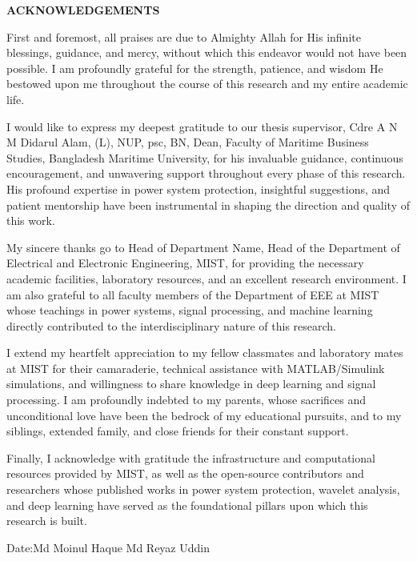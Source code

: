 \documentclass[12pt,a4paper,oneside]{report}
\newcommand{\frontchap}[1]{%
  \clearpage\thispagestyle{fancy}%
  \begin{center}\Large\bfseries #1\end{center}\vspace{6pt}%
  \addcontentsline{toc}{chapter}{#1}}
\begin{document}
\frontchap{ACKNOWLEDGEMENTS}
First and foremost, all praises are due to Almighty Allah for His infinite blessings, guidance, and mercy, without which this endeavor would not have been possible. I am profoundly grateful for the strength, patience, and wisdom He bestowed upon me throughout the course of this research and my entire academic life.

I would like to express my deepest gratitude to our thesis supervisor, Cdre A N M Didarul Alam, (L), NUP, psc, BN, Dean, Faculty of Maritime Business Studies, Bangladesh Maritime University, for his invaluable guidance, continuous encouragement, and unwavering support throughout every phase of this research. His profound expertise in power system protection, insightful suggestions, and patient mentorship have been instrumental in shaping the direction and quality of this work.

My sincere thanks go to Head of Department Name, Head of the Department of Electrical and Electronic Engineering, MIST, for providing the necessary academic facilities, laboratory resources, and an excellent research environment. I am also grateful to all faculty members of the Department of EEE at MIST whose teachings in power systems, signal processing, and machine learning directly contributed to the interdisciplinary nature of this research.

I extend my heartfelt appreciation to my fellow classmates and laboratory mates at MIST for their camaraderie, technical assistance with MATLAB/Simulink simulations, and willingness to share knowledge in deep learning and signal processing. I am profoundly indebted to my parents, whose sacrifices and unconditional love have been the bedrock of my educational pursuits, and to my siblings, extended family, and close friends for their constant support.

Finally, I acknowledge with gratitude the infrastructure and computational resources provided by MIST, as well as the open-source contributors and researchers whose published works in power system protection, wavelet analysis, and deep learning have served as the foundational pillars upon which this research is built.

\vspace{18pt}\noindent Date:\hfill Md Moinul Haque \quad Md Reyaz Uddin
\end{document}
